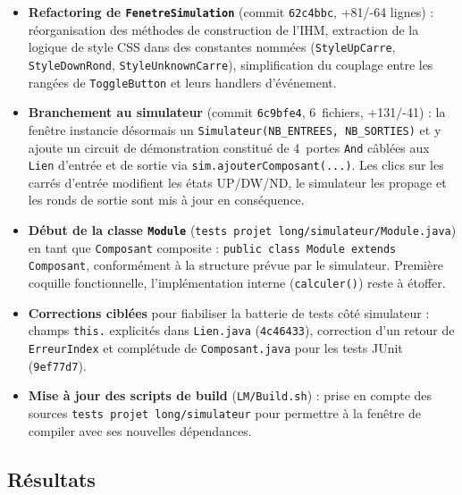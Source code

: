 \documentclass[11pt,a4paper]{article}
\begin{document}
\begin{itemize}
  \item \textbf{Refactoring de \texttt{FenetreSimulation}} (commit \texttt{62c4bbc}, +81/-64 lignes) : r\'eorganisation des m\'ethodes de construction de l'IHM, extraction de la logique de style CSS dans des constantes nomm\'ees (\texttt{StyleUpCarre}, \texttt{StyleDownRond}, \texttt{StyleUnknownCarre}), simplification du couplage entre les rang\'ees de \texttt{ToggleButton} et leurs handlers d'\'ev\'enement.
  \item \textbf{Branchement au simulateur} (commit \texttt{6c9bfe4}, 6~fichiers, +131/-41) : la fen\^etre instancie d\'esormais un \texttt{Simulateur(NB\_ENTREES, NB\_SORTIES)} et y ajoute un circuit de d\'emonstration constitu\'e de 4~portes \texttt{And} c\^abl\'ees aux \texttt{Lien} d'entr\'ee et de sortie via \texttt{sim.ajouterComposant(...)}. Les clics sur les carr\'es d'entr\'ee modifient les \'etats UP/DW/ND, le simulateur les propage et les ronds de sortie sont mis \`a jour en cons\'equence.
  \item \textbf{D\'ebut de la classe \texttt{Module}} (\texttt{tests projet long/simulateur/Module.java}) en tant que \texttt{Composant} composite : \texttt{public class Module extends Composant}, conform\'ement \`a la structure pr\'evue par le simulateur. Premi\`ere coquille fonctionnelle, l'impl\'ementation interne (\texttt{calculer()}) reste \`a \'etoffer.
  \item \textbf{Corrections cibl\'ees} pour fiabiliser la batterie de tests c\^ot\'e simulateur : champs \texttt{this.} explicit\'es dans \texttt{Lien.java} (\texttt{4c46433}), correction d'un retour de \texttt{ErreurIndex} et compl\'etude de \texttt{Composant.java} pour les tests JUnit (\texttt{9ef77d7}).
  \item \textbf{Mise \`a jour des scripts de build} (\texttt{LM/Build.sh}) : prise en compte des sources \texttt{tests projet long/simulateur} pour permettre \`a la fen\^etre de compiler avec ses nouvelles d\'ependances.
\end{itemize}

\subsection*{R\'esultats}
\end{document}
